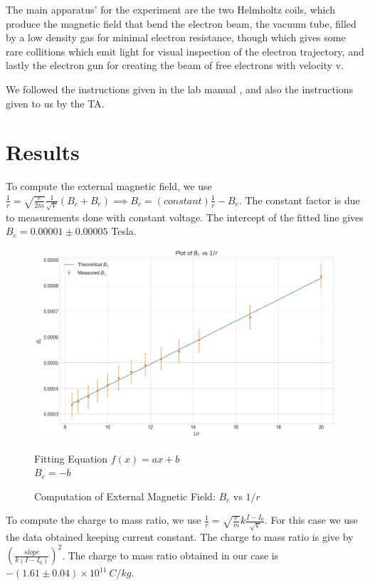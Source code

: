 \documentclass[a4paper,12pt]{article}
\begin{document}
The main apparatus' for the experiment are the two Helmholtz coils, which produce the magnetic field that bend the electron beam, 
the vacuum tube, filled by a low density gas for minimal electron resistance, though which gives some rare collitions which emit
light for visual inspection of the electron trajectory, and lastly the electron gun for creating the beam of free electrons with velocity v.

We followed the instructions given in the lab manual \cite{lab-manual-ex8}, and also the instructions given to us by the TA.

\section{Results}

To compute the external magnetic field, we use $\frac{1}{r} = \sqrt{\frac{e}{2m}}\frac{1}{\sqrt{V}}(B_c + B_e) \implies B_c = (constant)\frac{1}{r} - B_e$. 
The constant factor is due to measurements done with constant voltage. The intercept of the fitted line gives $B_e = 0.00001 \pm 0.00005$ Tesla.

\begin{figure}[H]
  \centering
  \includegraphics[width=0.8\linewidth]{../code/Pankaj/Coil B vs r_1.png} 
  \begin{center}
    Fitting Equation $f(x) = ax+b$ \\
    $B_e = -b$
  \end{center}  
    \caption{Computation of External Magnetic Field: $B_c$ vs $1/r$}
    \label{b_e}
\end{figure}

To compute the charge to mass ratio, we use $\frac{1}{r} = \sqrt{\frac{e}{m}}k\frac{I-I_0}{\sqrt{V}}$. For this case we use the data
obtained keeping current constant. The charge to mass ratio is give by $(\frac{slope}{k(I-I_0)})^2$. The charge to mass ratio
obtained in our case is $-(1.61 \pm 0.04) \times 10^{11}\ C/kg$.
\end{document}
